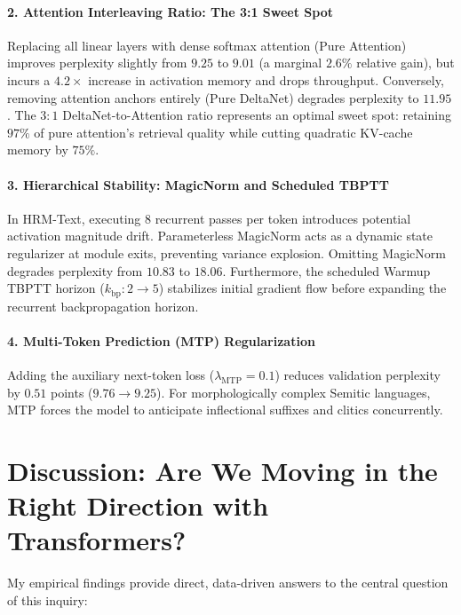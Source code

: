 \documentclass[11pt,a4paper]{article}
\begin{document}
\paragraph{2. Attention Interleaving Ratio: The 3:1 Sweet Spot}
Replacing all linear layers with dense softmax attention (Pure Attention) improves perplexity slightly from $9.25$ to $9.01$ (a marginal $2.6\%$ relative gain), but incurs a $4.2\times$ increase in activation memory and drops throughput. Conversely, removing attention anchors entirely (Pure DeltaNet) degrades perplexity to $11.95$. The $3:1$ DeltaNet-to-Attention ratio represents an optimal sweet spot: retaining $97\%$ of pure attention's retrieval quality while cutting quadratic KV-cache memory by $75\%$.

\paragraph{3. Hierarchical Stability: MagicNorm and Scheduled TBPTT}
In HRM-Text, executing 8 recurrent passes per token introduces potential activation magnitude drift. Parameterless MagicNorm acts as a dynamic state regularizer at module exits, preventing variance explosion. Omitting MagicNorm degrades perplexity from $10.83$ to $18.06$. Furthermore, the scheduled Warmup TBPTT horizon ($k_{\text{bp}}: 2 \rightarrow 5$) stabilizes initial gradient flow before expanding the recurrent backpropagation horizon.

\paragraph{4. Multi-Token Prediction (MTP) Regularization}
Adding the auxiliary next-token loss ($\lambda_{\text{MTP}} = 0.1$) reduces validation perplexity by $0.51$ points ($9.76 \rightarrow 9.25$). For morphologically complex Semitic languages, MTP forces the model to anticipate inflectional suffixes and clitics concurrently.

\section{Discussion: Are We Moving in the Right Direction with Transformers?}
\label{sec:discussion}

My empirical findings provide direct, data-driven answers to the central question of this inquiry:
\end{document}
